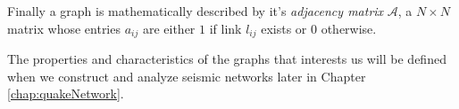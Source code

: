 Finally a graph is mathematically described by it's {\it adjacency matrix} $\mathcal{A}$, a $N \times N$ matrix whose entries $a_{ij}$ are either $1$ if link $l_{ij}$ exists or $0$ 
otherwise.\par 

The properties and characteristics of the graphs that interests us will be defined when we construct and analyze seismic networks later in Chapter \ref{chap:quakeNetwork}.

